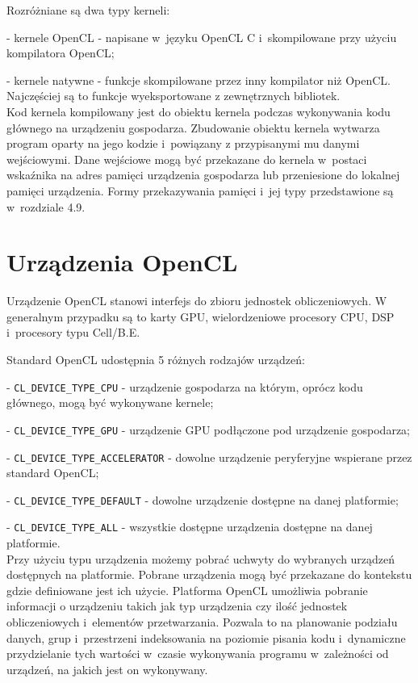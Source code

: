 Rozróżniane są dwa typy kerneli:

- kernele OpenCL - napisane w~języku OpenCL C i~skompilowane przy użyciu kompilatora OpenCL;

- kernele natywne - funkcje skompilowane przez inny kompilator niż OpenCL. Najczęściej są to funkcje wyeksportowane z zewnętrznych bibliotek.
\\
Kod kernela kompilowany jest do obiektu kernela podczas wykonywania kodu głównego na urządzeniu gospodarza. Zbudowanie obiektu kernela wytwarza program oparty na jego kodzie i~powiązany z przypisanymi mu danymi wejściowymi. Dane wejściowe mogą być przekazane do kernela w~postaci wskaźnika na adres pamięci urządzenia gospodarza lub przeniesione do lokalnej pamięci urządzenia. Formy przekazywania pamięci i~jej typy przedstawione są w~rozdziale 4.9.

\section{Urządzenia OpenCL}\label{sec:OpenC21L}

Urządzenie OpenCL stanowi interfejs do zbioru jednostek obliczeniowych. W generalnym przypadku są to karty GPU, wielordzeniowe procesory CPU, DSP i~procesory typu Cell/B.E.

Standard OpenCL udostępnia 5 różnych rodzajów urządzeń:

- \verb|CL_DEVICE_TYPE_CPU| - urządzenie gospodarza na którym, oprócz kodu głównego, mogą być wykonywane kernele;

- \verb|CL_DEVICE_TYPE_GPU| - urządzenie GPU podłączone pod urządzenie gospodarza;

- \verb|CL_DEVICE_TYPE_ACCELERATOR| - dowolne urządzenie peryferyjne wspierane przez standard OpenCL;

- \verb|CL_DEVICE_TYPE_DEFAULT| - dowolne urządzenie dostępne na danej platformie;

- \verb|CL_DEVICE_TYPE_ALL| - wszystkie dostępne urządzenia dostępne na danej platformie.
\\

Przy użyciu typu urządzenia możemy pobrać uchwyty do wybranych urządzeń dostępnych na platformie. Pobrane urządzenia mogą być przekazane do kontekstu gdzie definiowane jest ich użycie. Platforma OpenCL umożliwia pobranie informacji o urządzeniu takich jak typ urządzenia czy ilość jednostek obliczeniowych i~elementów przetwarzania. Pozwala to na planowanie podziału danych, grup i~przestrzeni indeksowania na poziomie pisania kodu i~dynamiczne przydzielanie tych wartości w~czasie wykonywania programu w~zależności od urządzeń, na jakich jest on wykonywany.
 

